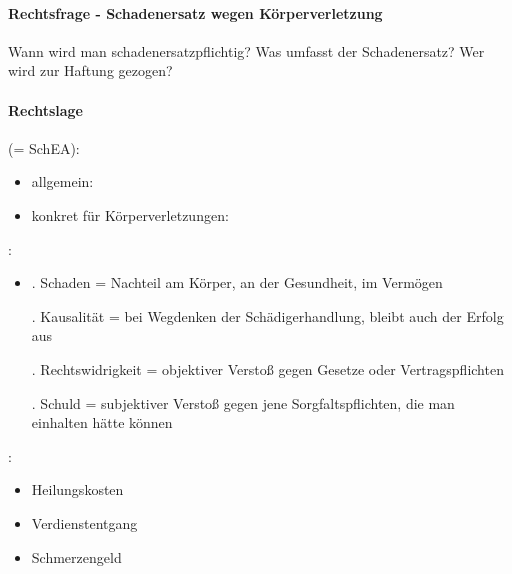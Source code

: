 \paragraph*{Rechtsfrage - Schadenersatz wegen K\"orperverletzung}

Wann wird man schadenersatzpflichtig? Was umfasst der Schadenersatz? Wer
wird zur Haftung gezogen?

\paragraph*{Rechtslage}

 (= SchEA):

\begin{itemize}

	\item {\mdseries
	allgemein: }

	\item {\mdseries
	konkret f\"ur K\"orperverletzungen: }

\end{itemize}

:

\begin{itemize}

	\item[] {. Schaden = Nachteil am K\"orper, an der Gesundheit, im Verm\"ogen}

	{. Kausalität = bei Wegdenken der Schädigerhandlung, bleibt auch der
	Erfolg aus}

	{. Rechtswidrigkeit = objektiver Versto{\ss} gegen Gesetze oder
	Vertragspflichten}

	{. Schuld = subjektiver Versto{\ss} gegen jene Sorgfaltspflichten, die
	man einhalten hätte k\"onnen}

\end{itemize}

:

\begin{itemize}

	\item {\mdseries
	Heilungskosten}

	\item {\mdseries
	Verdienstentgang}

	\item {\mdseries
	Schmerzengeld}

\end{itemize}


